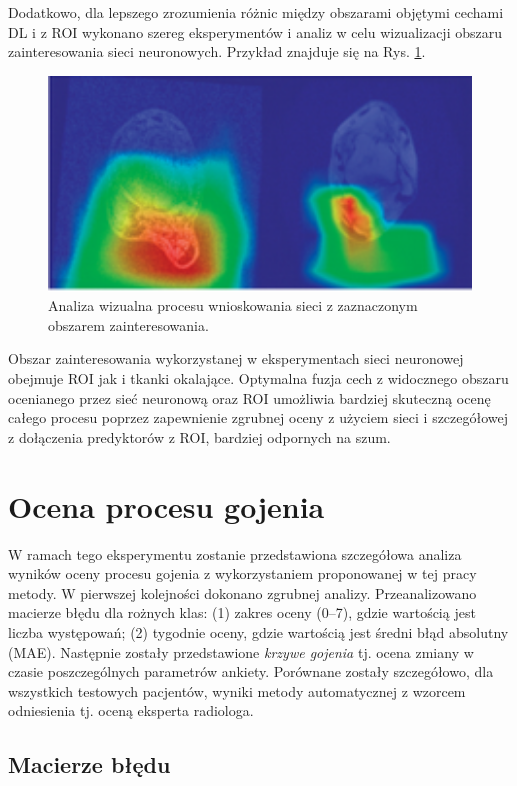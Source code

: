 Dodatkowo, dla lepszego zrozumienia różnic między obszarami objętymi cechami DL i z ROI wykonano szereg eksperymentów i analiz w celu wizualizacji obszaru zainteresowania sieci neuronowych. Przykład znajduje się na Rys. \ref{fig:XAI}.  
\begin{figure}[h]
	\centering
	\includegraphics[width=1\textwidth]{figures/XAI.png}
	\caption{Analiza wizualna procesu wnioskowania sieci z zaznaczonym obszarem zainteresowania.}\label{fig:XAI}
\end{figure}
Obszar zainteresowania wykorzystanej w eksperymentach sieci neuronowej obejmuje ROI jak i tkanki okalające. Optymalna fuzja cech z widocznego obszaru ocenianego przez sieć neuronową oraz ROI umożliwia bardziej skuteczną ocenę całego procesu poprzez zapewnienie zgrubnej oceny z użyciem sieci i szczegółowej z dołączenia predyktorów z ROI, bardziej odpornych na szum. 

\section{Ocena procesu gojenia}

W ramach tego eksperymentu zostanie przedstawiona szczegółowa analiza wyników oceny procesu gojenia z wykorzystaniem proponowanej w tej pracy metody. W pierwszej kolejności dokonano zgrubnej analizy. Przeanalizowano macierze błędu dla rożnych klas: (1) zakres oceny (0--7), gdzie wartością jest liczba występowań; (2) tygodnie oceny, gdzie wartością jest średni błąd absolutny (MAE). Następnie zostały przedstawione \textit{krzywe gojenia} tj. ocena zmiany w czasie poszczególnych parametrów ankiety. Porównane zostały szczegółowo, dla wszystkich testowych pacjentów, wyniki metody automatycznej z wzorcem odniesienia tj. oceną eksperta radiologa.

\subsection{Macierze błędu}

